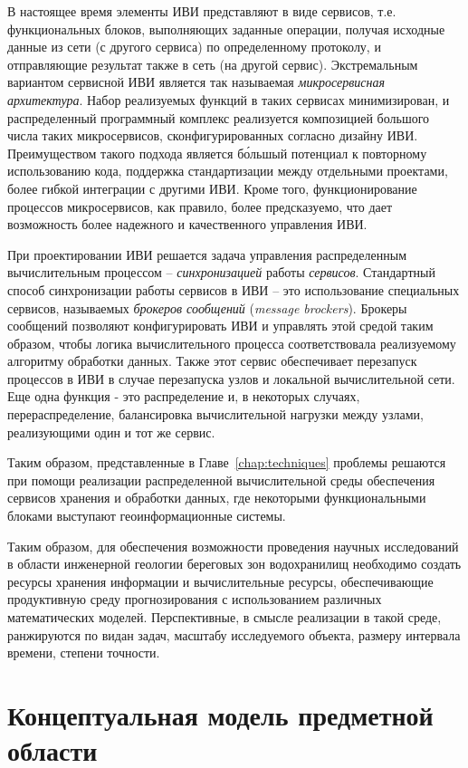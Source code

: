 \documentclass[732,fontsize=14pt,final]{studrep}
\begin{document}
В настоящее время элементы ИВИ представляют в виде сервисов, т.е. функциональных блоков, выполняющих заданные операции, получая исходные данные из сети (с другого сервиса) по определенному протоколу, и отправляющие результат также в сеть (на другой сервис). Экстремальным вариантом сервисной ИВИ является так называемая \emph{микросервисная архитектура}. Набор реализуемых функций в таких сервисах минимизирован, и распределенный программный комплекс реализуется композицией большого числа таких микросервисов, сконфигурированных согласно дизайну ИВИ. Преимуществом такого подхода является б\'ольшый потенциал к повторному использованию кода, поддержка стандартизации между отдельными проектами, более гибкой интеграции с другими ИВИ. Кроме того, функционирование процессов микросервисов, как правило, более предсказуемо, что дает возможность более надежного и качественного управления ИВИ.

При проектировании ИВИ решается задача управления распределенным вычислительным процессом -- \emph{синхронизацией} работы \emph{сервисов}. Стандартный способ синхронизации работы сервисов в ИВИ -- это использование специальных сервисов, называемых \emph{брокеров сообщений} (\emph{message brockers}). Брокеры сообщений позволяют конфигурировать ИВИ и управлять этой средой таким образом, чтобы логика вычислительного процесса соответствовала реализуемому алгоритму обработки данных. Также этот сервис обеспечивает перезапуск процессов в ИВИ в случае перезапуска узлов и локальной вычислительной сети. Еще одна функция - это распределение и, в некоторых случаях, перераспределение, балансировка вычислительной нагрузки между узлами, реализующими один и тот же сервис.

Таким образом, представленные в Главе~\ref{chap:techniques} проблемы решаются при помощи реализации распределенной вычислительной среды обеспечения сервисов хранения и обработки данных, где некоторыми функциональными блоками выступают геоинформационные системы.

Таким образом, для обеспечения возможности проведения научных исследований в области инженерной геологии береговых зон водохранилищ необходимо создать ресурсы хранения информации и вычислительные ресурсы, обеспечивающие продуктивную среду прогнозирования с использованием различных математических моделей. Перспективные, в смысле реализации в такой среде, ранжируются по видан задач, масштабу исследуемого объекта, размеру интервала времени, степени точности.

\section{Концептуальная модель предметной области}
\end{document}
